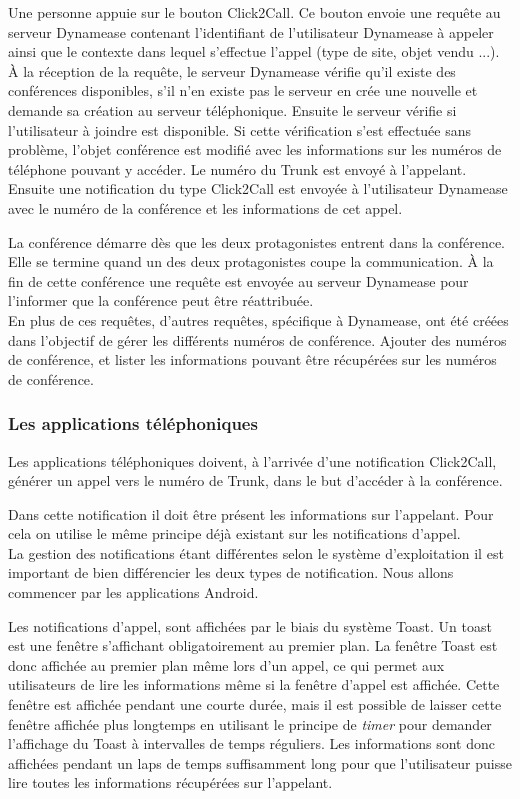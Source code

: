 Une personne appuie sur le bouton Click2Call. Ce bouton envoie une requête au serveur Dynamease contenant l'identifiant de l'utilisateur Dynamease à appeler ainsi que le contexte dans lequel s'effectue l'appel (type de site, objet vendu ...). À la réception de la requête, le serveur Dynamease vérifie qu'il existe des conférences disponibles, s'il n'en existe pas le serveur en crée une nouvelle et demande sa création au serveur téléphonique. Ensuite le serveur vérifie si l'utilisateur à joindre est disponible. Si cette vérification s'est effectuée sans problème, l'objet conférence est modifié avec les informations sur les numéros de téléphone pouvant y accéder. Le numéro du Trunk est envoyé à l'appelant. Ensuite une notification du type Click2Call est envoyée à l'utilisateur Dynamease avec le numéro de la conférence et les informations de cet appel.

La conférence démarre dès que les deux protagonistes entrent dans la conférence. Elle se termine quand un des deux protagonistes coupe la communication. À la fin de cette conférence une requête est envoyée au serveur Dynamease pour l'informer que la conférence peut être réattribuée.\\

En plus de ces requêtes, d'autres requêtes, spécifique à Dynamease, ont été créées dans l'objectif de gérer les différents numéros de conférence. Ajouter des numéros de conférence, et lister les informations pouvant être récupérées sur les numéros de conférence.

\subsubsection{Les applications téléphoniques} 

Les applications téléphoniques doivent, à l'arrivée d'une notification Click2Call, générer un appel vers le numéro de Trunk, dans le but d'accéder à la conférence.

Dans cette notification il doit être présent les informations sur l'appelant. Pour cela on utilise le même principe déjà existant sur les notifications d'appel.\\

La gestion des notifications étant différentes selon le système d'exploitation il est important de bien différencier les deux types de notification. Nous allons commencer par les applications Android.

Les notifications d'appel, sont affichées par le biais du système Toast. Un toast est une fenêtre s'affichant obligatoirement au premier plan. La fenêtre Toast est donc affichée au premier plan même lors d'un appel, ce qui permet aux utilisateurs de lire les informations même si la fenêtre d'appel est affichée. Cette fenêtre est affichée pendant une courte durée, mais il est possible de laisser cette fenêtre affichée plus longtemps en utilisant le principe de \textit{timer} pour demander l'affichage du Toast à intervalles de temps réguliers. Les informations sont donc affichées pendant un laps de temps suffisamment long pour que l'utilisateur puisse lire toutes les informations récupérées sur l'appelant.

